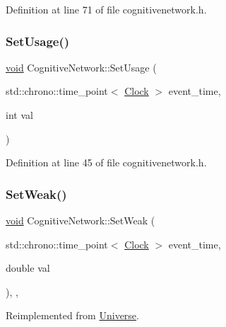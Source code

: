 Definition at line 71 of file cognitivenetwork.\+h.

\mbox{\label{class_cognitive_network_a8b6b4afc47df279604be13bce77f5b0a}} 
\subsubsection{\texorpdfstring{Set\+Usage()}{SetUsage()}}
{\footnotesize\ttfamily \mbox{\hyperlink{glad_8h_a950fc91edb4504f62f1c577bf4727c29}{void}} Cognitive\+Network\+::\+Set\+Usage (\begin{DoxyParamCaption}\item[{std\+::chrono\+::time\+\_\+point$<$ \mbox{\hyperlink{universe_8h_a0ef8d951d1ca5ab3cfaf7ab4c7a6fd80}{Clock}} $>$}]{event\+\_\+time,  }\item[{int}]{val }\end{DoxyParamCaption})\hspace{0.3cm}{\ttfamily [inline]}}



Definition at line 45 of file cognitivenetwork.\+h.

\mbox{\label{class_cognitive_network_ab39c9eed50da6d3630c4498ae64b804e}} 
\subsubsection{\texorpdfstring{Set\+Weak()}{SetWeak()}}
{\footnotesize\ttfamily \mbox{\hyperlink{glad_8h_a950fc91edb4504f62f1c577bf4727c29}{void}} Cognitive\+Network\+::\+Set\+Weak (\begin{DoxyParamCaption}\item[{std\+::chrono\+::time\+\_\+point$<$ \mbox{\hyperlink{universe_8h_a0ef8d951d1ca5ab3cfaf7ab4c7a6fd80}{Clock}} $>$}]{event\+\_\+time,  }\item[{double}]{val }\end{DoxyParamCaption})\hspace{0.3cm}{\ttfamily [inline]}, {\ttfamily [final]}, {\ttfamily [virtual]}}



Reimplemented from \mbox{\hyperlink{class_universe_a0f5cd04081b41ee931c0557dc397f6fb}{Universe}}.



